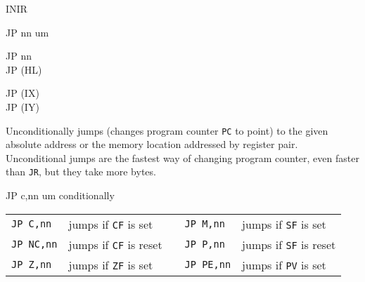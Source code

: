 \begin{basedescript}{
	\desclabelstyle{\multilinelabel}
	\desclabelwidth{3cm}}
\begin{DetailItem}{INIR}
		\begin{DetailTiming}
		\end{DetailTiming}

	\end{DetailItem}

	\pagebreak
	\begin{DetailItem}{JP nn}
		{um\IH{P}}
		{\SymJP{nn}}

		\begin{DetailVariants}
			JP nn\\
			JP (HL)
			
			\columnbreak
			JP (IX)\\
			JP (IY)
		\end{DetailVariants}

		Unconditionally jumps (changes program counter {\tt PC} to point) to the given absolute address or the memory location addressed by register pair. Unconditional jumps are the fastest way of changing program counter, even faster than {\tt JR}, but they take more bytes.

		\begin{DetailEffects}
			\FlagsJPnn
		\end{DetailEffects}
				
		\begin{DetailTiming}
			\DetailTime[(HL)]{1}{4}
			\DetailTime[(IX)]{2}{8}
			\DetailTime[(IY)]{2}{8}
			\DetailTime[nn]{3}{10}
		\end{DetailTiming}

	\end{DetailItem}

	\begin{DetailItem}{JP c,nn}
		{um conditionally}
		{\SymJPc{nn}}

		\vspace{1ex} %
		\begin{tabular}{@{}llcll}			
			{\tt JP C,nn} & jumps if {\tt CF} is set & &
				{\tt JP M,nn} & jumps if {\tt SF} is set\\

			{\tt JP NC,nn} & jumps if {\tt CF} is reset & &
				{\tt JP P,nn} & jumps if {\tt SF} is reset\\

			{\tt JP Z,nn} & jumps if {\tt ZF} is set & &
				{\tt JP PE,nn} & jumps if {\tt PV} is set\\


\end{tabular}
\end{DetailItem}
\end{basedescript}
